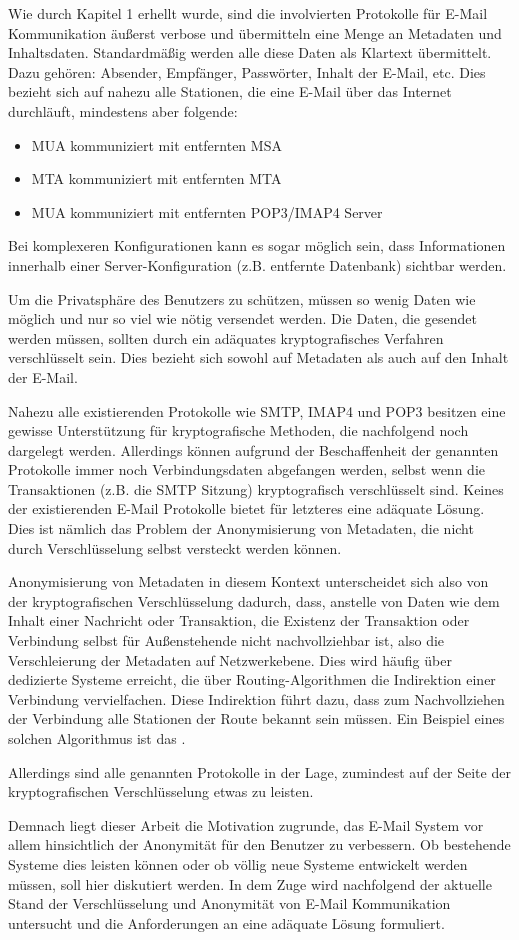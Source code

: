 Wie durch Kapitel 1 erhellt wurde, sind die involvierten Protokolle für E-Mail Kommunikation äußerst verbose und übermitteln eine Menge an Metadaten und Inhaltsdaten. Standardmäßig werden alle diese Daten als Klartext übermittelt. Dazu gehören: Absender, Empfänger, Passwörter, Inhalt der E-Mail, etc. Dies bezieht sich auf nahezu alle Stationen, die eine E-Mail über das Internet durchläuft, mindestens aber folgende:
\begin{itemize}
\item MUA kommuniziert mit entfernten MSA
\item MTA kommuniziert mit entfernten MTA
\item MUA kommuniziert mit entfernten POP3/IMAP4 Server
\end{itemize}

Bei komplexeren Konfigurationen kann es sogar möglich sein, dass Informationen innerhalb einer Server-Konfiguration (z.B. entfernte Datenbank) sichtbar werden.

Um die Privatsphäre des Benutzers zu schützen, müssen so wenig Daten wie möglich und nur so viel wie nötig versendet werden. Die Daten, die gesendet werden müssen, sollten durch ein adäquates kryptografisches Verfahren verschlüsselt sein. Dies bezieht sich sowohl auf Metadaten als auch auf den Inhalt der E-Mail.

Nahezu alle existierenden Protokolle wie SMTP, IMAP4 und POP3 besitzen eine gewisse Unterstützung für kryptografische Methoden, die nachfolgend noch dargelegt werden. Allerdings können aufgrund der Beschaffenheit der genannten Protokolle immer noch Verbindungsdaten abgefangen werden, selbst wenn die Transaktionen (z.B. die SMTP Sitzung) kryptografisch verschlüsselt sind. Keines der existierenden E-Mail Protokolle bietet für letzteres eine adäquate Lösung. Dies ist nämlich das Problem der Anonymisierung von Metadaten, die nicht durch Verschlüsselung selbst versteckt werden können.

Anonymisierung von Metadaten in diesem Kontext unterscheidet sich also von der kryptografischen Verschlüsselung dadurch, dass, anstelle von Daten wie dem Inhalt einer Nachricht oder Transaktion, die Existenz der Transaktion oder Verbindung selbst für Außenstehende nicht nachvollziehbar ist, also die Verschleierung der Metadaten auf Netzwerkebene. Dies wird häufig über dedizierte Systeme erreicht, die über Routing-Algorithmen die Indirektion einer Verbindung vervielfachen. Diese Indirektion führt dazu, dass zum Nachvollziehen der Verbindung alle Stationen der Route bekannt sein müssen. Ein Beispiel eines solchen Algorithmus ist das .

Allerdings sind alle genannten Protokolle in der Lage, zumindest auf der Seite der kryptografischen Verschlüsselung etwas zu leisten.

Demnach liegt dieser Arbeit die Motivation zugrunde, das E-Mail System vor allem hinsichtlich der Anonymität für den Benutzer zu verbessern. Ob bestehende Systeme dies leisten können oder ob völlig neue Systeme entwickelt werden müssen, soll hier diskutiert werden.
In dem Zuge wird nachfolgend der aktuelle Stand der Verschlüsselung und Anonymität von E-Mail Kommunikation untersucht und die Anforderungen an eine adäquate Lösung formuliert.
